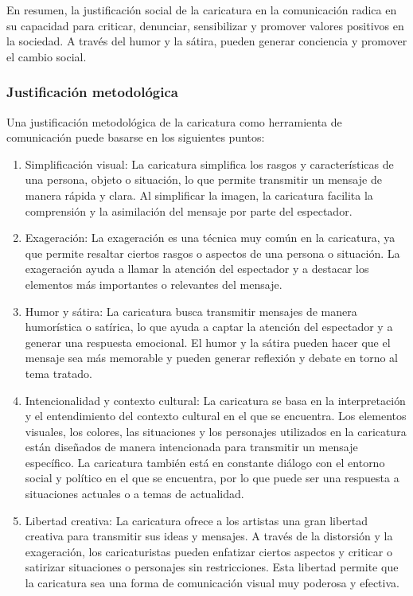 \documentclass[12pt,a4paper]{article}
\begin{document}
En resumen, la justificación social de la caricatura en la comunicación radica en su capacidad para criticar, denunciar, sensibilizar y promover valores positivos en la sociedad. A través del humor y la sátira, pueden generar conciencia y promover el cambio social.

\subsubsection{Justificación metodológica}
Una justificación metodológica de la caricatura como herramienta de comunicación puede basarse en los siguientes puntos:


\begin{enumerate}
	\item  Simplificación visual: La caricatura simplifica los rasgos y características de una persona, objeto o situación, lo que permite transmitir un mensaje de manera rápida y clara. Al simplificar la imagen, la caricatura facilita la comprensión y la asimilación del mensaje por parte del espectador.
	\item  Exageración: La exageración es una técnica muy común en la caricatura, ya que permite resaltar ciertos rasgos o aspectos de una persona o situación. La exageración ayuda a llamar la atención del espectador y a destacar los elementos más importantes o relevantes del mensaje.
	\item  Humor y sátira: La caricatura busca transmitir mensajes de manera humorística o satírica, lo que ayuda a captar la atención del espectador y a generar una respuesta emocional. El humor y la sátira pueden hacer que el mensaje sea más memorable y pueden generar reflexión y debate en torno al tema tratado.
	\item  Intencionalidad y contexto cultural: La caricatura se basa en la interpretación y el entendimiento del contexto cultural en el que se encuentra. Los elementos visuales, los colores, las situaciones y los personajes utilizados en la caricatura están diseñados de manera intencionada para transmitir un mensaje específico. La caricatura también está en constante diálogo con el entorno social y político en el que se encuentra, por lo que puede ser una respuesta a situaciones actuales o a temas de actualidad.
	\item  Libertad creativa: La caricatura ofrece a los artistas una gran libertad creativa para transmitir sus ideas y mensajes. A través de la distorsión y la exageración, los caricaturistas pueden enfatizar ciertos aspectos y criticar o satirizar situaciones o personajes sin restricciones. Esta libertad permite que la caricatura sea una forma de comunicación visual muy poderosa y efectiva.
\end{enumerate}
\end{document}
